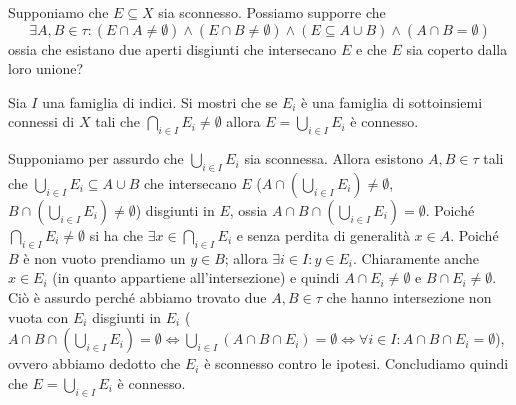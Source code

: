 \documentclass[a4paper]{article}\par \usepackage{style}\par
\begin{document}
\begin{es}
  Supponiamo che $ E \subseteq X $ sia sconnesso. Possiamo supporre che \[\exists A, B \in \tau : (E \cap A \neq \emptyset) \wedge (E \cap B \neq \emptyset) \wedge (E \subseteq A \cup B) \wedge (A \cap B = \emptyset)\] ossia che esistano due aperti disgiunti che intersecano $ E $ e che $ E $ sia coperto dalla loro unione?
\end{es}\par 
\begin{es}
  Sia $ I $ una famiglia di indici. Si mostri che se $ E_i $ è una famiglia di sottoinsiemi connessi di $ X $ tali che $ \bigcap_{i \in I} E_i \neq \emptyset $ allora $ E = \bigcup_{i \in I} E_i $ è connesso.
\end{es}\par Supponiamo per assurdo che $ \bigcup_{i \in I} E_i $ sia sconnessa. Allora esistono $ A, B \in \tau $ tali che $ \bigcup_{i \in I} E_i \subseteq A \cup B $ che intersecano $ E $ ($ A \cap \left(\bigcup_{i \in I} E_i\right) \neq \emptyset $, $ B \cap \left(\bigcup_{i \in I} E_i\right) \neq \emptyset $) disgiunti in $ E $, ossia $ A \cap B \cap \left(\bigcup_{i \in I} E_i\right) = \emptyset $. Poiché $ \bigcap_{i \in I} E_i \neq \emptyset $ si ha che $ \exists x \in \bigcap_{i \in I} E_i $ e senza perdita di generalità $ x \in A $. Poiché $ B $ è non vuoto prendiamo un $ y \in B $; allora $ \exists i \in I : y \in E_i $. Chiaramente anche $ x \in E_i $ (in quanto appartiene all'intersezione) e quindi $ A \cap E_i \neq \emptyset $ e $ B \cap E_i \neq \emptyset $. Ciò è assurdo perché abbiamo trovato due $ A, B \in \tau $ che hanno intersezione non vuota con $ E_i $ disgiunti in $ E_i $ ($ A \cap B \cap \left(\bigcup_{i \in I} E_i\right) = \emptyset  \iff \bigcup_{i \in I} (A \cap B \cap E_i) = \emptyset \iff \forall i \in I : A \cap B \cap E_i = \emptyset$), ovvero abbiamo dedotto che $ E_i $ è sconnesso contro le ipotesi. Concludiamo quindi che $ E = \bigcup_{i \in I} E_i $ è connesso. \\
\end{document}
